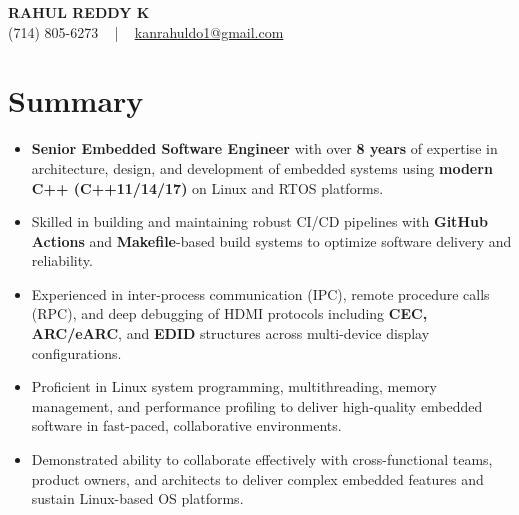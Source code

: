 \documentclass[letterpaper,11pt]{article}
\newcommand{\resumeItem}[1]{
  \item\footnotesize{
    {#1 \vspace{-2pt}}
  }
}
\newcommand{\resumeItemListStart}{\begin{itemize}[leftmargin=*]}
\newcommand{\resumeItemListEnd}{\end{itemize}\vspace{-5pt}}
\begin{document}
\begin{center}
    {\fontsize{14pt}{12pt}\selectfont \textbf{\MakeUppercase{Rahul Reddy K}}}\\ \vspace{2pt}
    \fontsize{10pt}{12pt}\selectfont (714) 805-6273 ~ | ~ \href{mailto:kanrahuldo1@gmail.com}{kanrahuldo1@gmail.com}~
    \vspace{-8pt}
\end{center}

\section{Summary}
\fontsize{9pt}{10pt}\selectfont
\resumeItemListStart
    \resumeItem{\textbf{Senior Embedded Software Engineer} with over \textbf{8 years} of expertise in architecture, design, and development of embedded systems using \textbf{modern C++ (C++11/14/17)} on Linux and RTOS platforms.} \vspace{-3pt}
    \resumeItem{Skilled in building and maintaining robust CI/CD pipelines with \textbf{GitHub Actions} and \textbf{Makefile}-based build systems to optimize software delivery and reliability.} \vspace{-3pt}
    \resumeItem{Experienced in inter-process communication (IPC), remote procedure calls (RPC), and deep debugging of HDMI protocols including \textbf{CEC, ARC/eARC}, and \textbf{EDID} structures across multi-device display configurations.} \vspace{-3pt}
    \resumeItem{Proficient in Linux system programming, multithreading, memory management, and performance profiling to deliver high-quality embedded software in fast-paced, collaborative environments.} \vspace{-3pt}
    \resumeItem{Demonstrated ability to collaborate effectively with cross-functional teams, product owners, and architects to deliver complex embedded features and sustain Linux-based OS platforms.}
\resumeItemListEnd
\vspace{-6pt}
\end{document}
